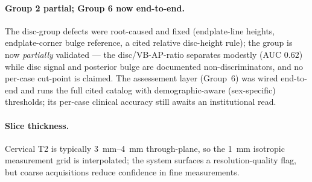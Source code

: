 \paragraph{Group 2 partial; Group 6 now end-to-end.} The disc-group defects were root-caused and fixed
(endplate-line heights, endplate-corner bulge reference, a cited relative disc-height rule); the group is
now \emph{partially} validated --- the disc/VB-AP-ratio separates modestly (AUC $0.62$) while disc signal
and posterior bulge are documented non-discriminators, and no per-case cut-point is claimed. The
assessement layer (Group~6) was wired end-to-end and runs the full cited catalog with
demographic-aware (sex-specific) thresholds; its per-case clinical accuracy still awaits an institutional
read.

\paragraph{Slice thickness.} Cervical T2 is typically \SIrange{3}{4}{\milli\meter} through-plane, so the
\SI{1}{\milli\meter} isotropic measurement grid is interpolated; the system surfaces a
resolution-quality flag, but coarse acquisitions reduce confidence in fine measurements.

